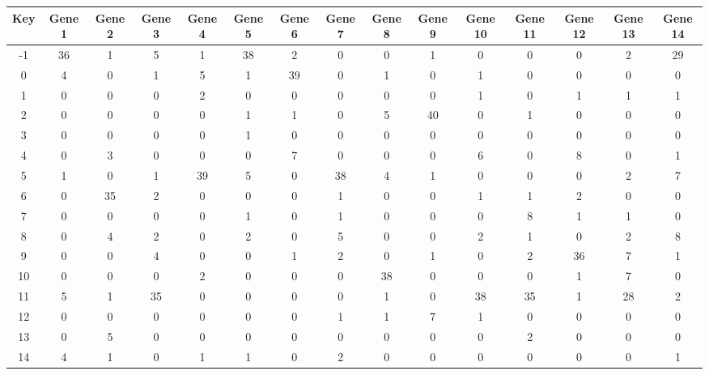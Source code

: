 \begin{tabular}{|c|c|c|c|c|c|c|c|c|c|c|c|c|c|c|}
\hline
Key & Gene 1 & Gene 2 & Gene 3 & Gene 4 & Gene 5 & Gene 6 & Gene 7 & Gene 8 & Gene 9 & Gene 10 & Gene 11 & Gene 12 & Gene 13 & Gene 14 \\
\hline
-1 & 36 & 1 & 5 & 1 & 38 & 2 & 0 & 0 & 1 & 0 & 0 & 0 & 2 & 29 \\
0 & 4 & 0 & 1 & 5 & 1 & 39 & 0 & 1 & 0 & 1 & 0 & 0 & 0 & 0 \\
1 & 0 & 0 & 0 & 2 & 0 & 0 & 0 & 0 & 0 & 1 & 0 & 1 & 1 & 1 \\
2 & 0 & 0 & 0 & 0 & 1 & 1 & 0 & 5 & 40 & 0 & 1 & 0 & 0 & 0 \\
3 & 0 & 0 & 0 & 0 & 1 & 0 & 0 & 0 & 0 & 0 & 0 & 0 & 0 & 0 \\
4 & 0 & 3 & 0 & 0 & 0 & 7 & 0 & 0 & 0 & 6 & 0 & 8 & 0 & 1 \\
5 & 1 & 0 & 1 & 39 & 5 & 0 & 38 & 4 & 1 & 0 & 0 & 0 & 2 & 7 \\
6 & 0 & 35 & 2 & 0 & 0 & 0 & 1 & 0 & 0 & 1 & 1 & 2 & 0 & 0 \\
7 & 0 & 0 & 0 & 0 & 1 & 0 & 1 & 0 & 0 & 0 & 8 & 1 & 1 & 0 \\
8 & 0 & 4 & 2 & 0 & 2 & 0 & 5 & 0 & 0 & 2 & 1 & 0 & 2 & 8 \\
9 & 0 & 0 & 4 & 0 & 0 & 1 & 2 & 0 & 1 & 0 & 2 & 36 & 7 & 1 \\
10 & 0 & 0 & 0 & 2 & 0 & 0 & 0 & 38 & 0 & 0 & 0 & 1 & 7 & 0 \\
11 & 5 & 1 & 35 & 0 & 0 & 0 & 0 & 1 & 0 & 38 & 35 & 1 & 28 & 2 \\
12 & 0 & 0 & 0 & 0 & 0 & 0 & 1 & 1 & 7 & 1 & 0 & 0 & 0 & 0 \\
13 & 0 & 5 & 0 & 0 & 0 & 0 & 0 & 0 & 0 & 0 & 2 & 0 & 0 & 0 \\
14 & 4 & 1 & 0 & 1 & 1 & 0 & 2 & 0 & 0 & 0 & 0 & 0 & 0 & 1 \\
\hline
\end{tabular}
